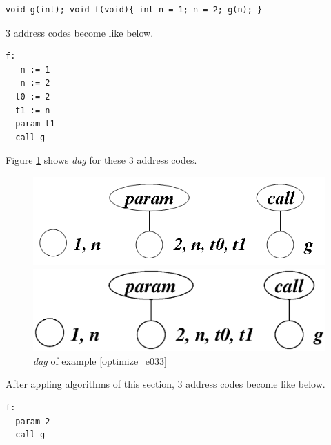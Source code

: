 \begin{Example}
\label{optimize_e033}
\begin{verbatim}
void g(int); void f(void){ int n = 1; n = 2; g(n); }
\end{verbatim}
3 address codes become like below.
\begin{verbatim}
f:
   n := 1
   n := 2
  t0 := 2
  t1 := n
  param t1
  call g
\end{verbatim}
Figure \ref{optimize_e034} shows {\em dag} for these 3 address codes.
\begin{figure}[htbp]
\begin{center}
\begin{htmlonly}
\includegraphics[width=0.8\linewidth,height=0.247\linewidth]{opt018.png}
\end{htmlonly}
\begin{latexonly}
\includegraphics[width=0.8\linewidth,height=0.247\linewidth]{opt018.eps}
\end{latexonly}
\caption{{\em dag} of example \ref{optimize_e033}}
\label{optimize_e034}
\end{center}
\end{figure}
After appling algorithms of this section,
3 address codes become like below.
\begin{verbatim}
f:
  param 2
  call g
\end{verbatim}
\end{Example}

